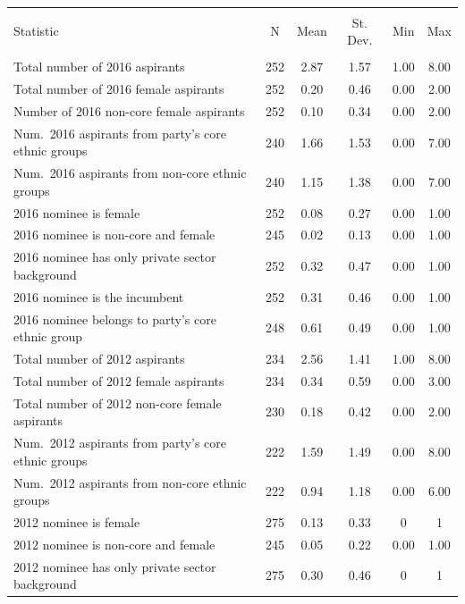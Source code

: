 
\begin{table}[!htbp] \centering 
  \caption{} 
  \label{} 
\begin{tabular}{@{\extracolsep{3pt}}lccccc} 
\\[-1.8ex]\hline 
\hline \\[-1.8ex] 
Statistic & \multicolumn{1}{c}{N} & \multicolumn{1}{c}{Mean} & \multicolumn{1}{c}{St. Dev.} & \multicolumn{1}{c}{Min} & \multicolumn{1}{c}{Max} \\ 
\hline \\[-1.8ex] 
Total number of 2016 aspirants & 252 & 2.87 & 1.57 & 1.00 & 8.00 \\ 
Total number of 2016 female aspirants & 252 & 0.20 & 0.46 & 0.00 & 2.00 \\ 
Number of 2016 non-core female aspirants & 252 & 0.10 & 0.34 & 0.00 & 2.00 \\ 
Num.~2016 aspirants from party's core ethnic groups & 240 & 1.66 & 1.53 & 0.00 & 7.00 \\ 
Num.~2016 aspirants from non-core ethnic groups & 240 & 1.15 & 1.38 & 0.00 & 7.00 \\ 
2016 nominee is female & 252 & 0.08 & 0.27 & 0.00 & 1.00 \\ 
2016 nominee is non-core and female & 245 & 0.02 & 0.13 & 0.00 & 1.00 \\ 
2016 nominee has only private sector background & 252 & 0.32 & 0.47 & 0.00 & 1.00 \\ 
2016 nominee is the incumbent & 252 & 0.31 & 0.46 & 0.00 & 1.00 \\ 
2016 nominee belongs to party's core ethnic group & 248 & 0.61 & 0.49 & 0.00 & 1.00 \\ 
Total number of 2012 aspirants & 234 & 2.56 & 1.41 & 1.00 & 8.00 \\ 
Total number of 2012 female aspirants & 234 & 0.34 & 0.59 & 0.00 & 3.00 \\ 
Total number of 2012 non-core female aspirants & 230 & 0.18 & 0.42 & 0.00 & 2.00 \\ 
Num.~2012 aspirants from party's core ethnic groups & 222 & 1.59 & 1.49 & 0.00 & 8.00 \\ 
Num.~2012 aspirants from non-core ethnic groups & 222 & 0.94 & 1.18 & 0.00 & 6.00 \\ 
2012 nominee is female & 275 & 0.13 & 0.33 & 0 & 1 \\ 
2012 nominee is non-core and female & 245 & 0.05 & 0.22 & 0.00 & 1.00 \\ 
2012 nominee has only private sector background & 275 & 0.30 & 0.46 & 0 & 1 \\ 

\end{tabular}
\end{table}

